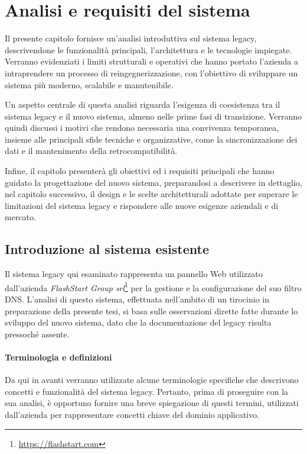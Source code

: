 \chapter{Analisi e requisiti del sistema}

Il presente capitolo fornisce un'analisi introduttiva sul sistema legacy, descrivendone le funzionalità principali, l'architettura e le tecnologie impiegate. Verranno evidenziati i limiti strutturali e operativi che hanno portato l'azienda a intraprendere un processo di reingegnerizzazione, con l'obiettivo di sviluppare un sistema più moderno, scalabile e manutenibile.

Un aspetto centrale di questa analisi riguarda l’esigenza di coesistenza tra il sistema legacy e il nuovo sistema, almeno nelle prime fasi di transizione. Verranno quindi discussi i motivi che rendono necessaria una convivenza temporanea, insieme alle principali sfide tecniche e organizzative, come la sincronizzazione dei dati e il mantenimento della retrocompatibilità.

Infine, il capitolo presenterà gli obiettivi ed i requisiti principali che hanno guidato la progettazione del nuovo sistema, preparandosi a descrivere in dettaglio, nel capitolo successivo, il design e le scelte architetturali adottate per superare le limitazioni del sistema legacy e rispondere alle nuove esigenze aziendali e di mercato.

\section{Introduzione al sistema esistente}
Il sistema legacy qui esaminato rappresenta un pannello Web utilizzato dall'azienda \textit{FlashStart Group srl}\footnote{\url{https://flashstart.com}} per la gestione e la configurazione del suo filtro DNS. L’analisi di questo sistema, effettuata nell’ambito di un tirocinio in preparazione della presente tesi, si basa sulle osservazioni dirette fatte durante lo sviluppo del nuovo sistema, dato che la documentazione del legacy risulta pressoché assente.

\subsubsection{Terminologia e definizioni}
Da qui in avanti verranno utilizzate alcune terminologie specifiche che descrivono concetti e funzionalità del sistema legacy. Pertanto, prima di proseguire con la sua analisi, è opportuno fornire una breve spiegazione di questi termini, utilizzati dall'azienda per rappresentare concetti chiave del dominio applicativo.

